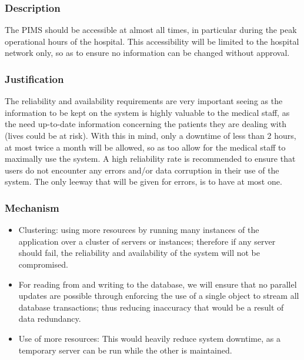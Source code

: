\subsubsection*{Description}
The PIMS should be accessible at almost all times, in particular during the peak operational hours of the hospital. This accessibility will be limited to the hospital network only, so as to ensure no information can be changed without approval.
		
\subsubsection*{Justification}
The reliability and availability requirements are very important seeing as the information to be kept on the system is highly valuable to the medical staff, as the need up-to-date information concerning the patients they are dealing with (lives could be at risk).							 
With this in mind, only a downtime of less than 2 hours, at most twice a month will be allowed, so as too allow for the medical staff to maximally use the system.
A high reliability rate is recommended to ensure that users do not encounter any errors and/or data corruption in their use of the system. The only leeway that will be given for errors, is to have at most one.
	
	
\subsubsection*{Mechanism}	
	\begin{itemize}
		\item Clustering: using more resources by running many instances of the application over a cluster of servers or instances; therefore if any server should fail, the reliability and availability of the system will not be compromised.
		\item For reading from and writing to the database, we will ensure that no parallel updates are possible through enforcing the use of a single object to stream all database transactions; thus reducing inaccuracy that would be a result of data redundancy.		 
		\item Use of more resources: This would heavily reduce system downtime, as a temporary server can be run while the other is maintained.
\end{itemize}

